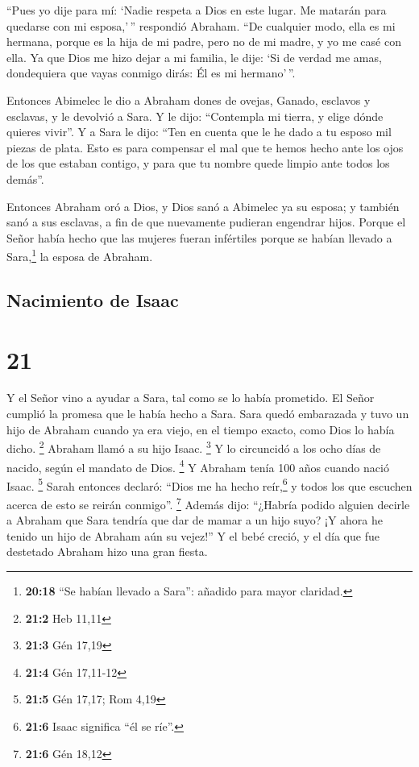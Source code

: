  ``Pues yo dije para mí: `Nadie respeta a Dios en este
lugar. Me matarán para quedarse con mi esposa,'\,'' respondió Abraham.
 ``De cualquier modo, ella es mi hermana, porque es la
hija de mi padre, pero no de mi madre, y yo me casé con ella.
 Ya que Dios me hizo dejar a mi familia, le dije: `Si de
verdad me amas, dondequiera que vayas conmigo dirás: Él es mi
hermano'\,''.

 Entonces Abimelec le dio a Abraham dones de ovejas,
Ganado, esclavos y esclavas, y le devolvió a Sara.  Y le
dijo: ``Contempla mi tierra, y elige dónde quieres vivir''.
 Y a Sara le dijo: ``Ten en cuenta que le he dado a tu
esposo mil piezas de plata. Esto es para compensar el mal que te hemos
hecho ante los ojos de los que estaban contigo, y para que tu nombre
quede limpio ante todos los demás''.

 Entonces Abraham oró a Dios, y Dios sanó a Abimelec ya
su esposa; y también sanó a sus esclavas, a fin de que nuevamente
pudieran engendrar hijos.  Porque el Señor había hecho
que las mujeres fueran infértiles porque se habían llevado a
Sara,\footnote{\textbf{20:18} ``Se habían llevado a Sara'': añadido para
  mayor claridad.} la esposa de Abraham.

\hypertarget{nacimiento-de-isaac}{%
\subsection{Nacimiento de Isaac}\label{nacimiento-de-isaac}}

\hypertarget{section-20}{%
\section{21}\label{section-20}}

 Y el Señor vino a ayudar a Sara, tal como se lo había
prometido. El Señor cumplió la promesa que le había hecho a Sara.
 Sara quedó embarazada y tuvo un hijo de Abraham cuando ya
era viejo, en el tiempo exacto, como Dios lo había dicho. \footnote{\textbf{21:2}
  Heb 11,11}  Abraham llamó a su hijo Isaac. \footnote{\textbf{21:3}
  Gén 17,19}  Y lo circuncidó a los ocho días de nacido,
según el mandato de Dios. \footnote{\textbf{21:4} Gén 17,11-12}
 Y Abraham tenía 100 años cuando nació Isaac. \footnote{\textbf{21:5}
  Gén 17,17; Rom 4,19}  Sarah entonces declaró: ``Dios me
ha hecho reír,\footnote{\textbf{21:6} Isaac significa ``él se ríe''.} y
todos los que escuchen acerca de esto se reirán conmigo''. \footnote{\textbf{21:6}
  Gén 18,12}  Además dijo: ``¿Habría podido alguien
decirle a Abraham que Sara tendría que dar de mamar a un hijo suyo? ¡Y
ahora he tenido un hijo de Abraham aún su vejez!''  Y el
bebé creció, y el día que fue destetado Abraham hizo una gran fiesta.

